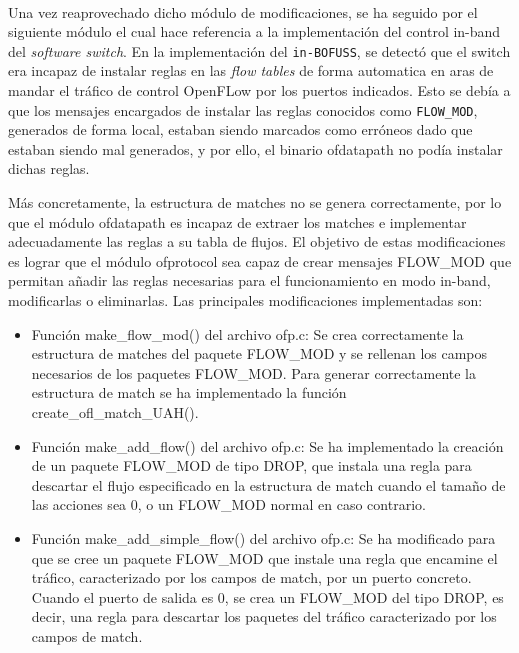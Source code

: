 \\
Una vez reaprovechado dicho módulo de modificaciones, se ha seguido por el siguiente módulo el cual hace referencia a la implementación del control in-band del \textit{software switch}. En la implementación del \texttt{in-BOFUSS}, se detectó que el switch era incapaz de instalar reglas en las \textit{flow tables} de forma automatica en aras de mandar el tráfico de control OpenFLow por los puertos indicados. Esto se debía a que los mensajes encargados de instalar las reglas conocidos como \texttt{FLOW\_MOD}, generados de forma local, estaban siendo marcados como erróneos dado que estaban siendo mal generados, y por ello, el binario ofdatapath no podía instalar dichas reglas.

Más concretamente, la estructura de matches no se genera correctamente, por lo que el módulo ofdatapath es incapaz de extraer los matches e implementar adecuadamente las reglas a su tabla de flujos. El objetivo de estas modificaciones es lograr que el módulo ofprotocol sea capaz de crear mensajes FLOW\_MOD que permitan añadir las reglas necesarias para el funcionamiento en modo in-band, modificarlas o eliminarlas. Las principales modificaciones implementadas son:

\begin{itemize}
    \item Función make\_flow\_mod() del archivo ofp.c: Se crea correctamente la estructura de matches del paquete FLOW\_MOD y se rellenan los campos necesarios de los paquetes FLOW\_MOD. Para generar correctamente la estructura de match se ha implementado la función create\_ofl\_match\_UAH().

    \item Función make\_add\_flow() del archivo ofp.c: Se ha implementado la creación de un paquete FLOW\_MOD de tipo DROP, que instala una regla para descartar el flujo especificado en la estructura de match cuando el tamaño de las acciones sea 0, o un FLOW\_MOD normal en caso contrario.

    \item Función make\_add\_simple\_flow() del archivo ofp.c: Se ha modificado para que se cree un paquete FLOW\_MOD que instale una regla que encamine el tráfico, caracterizado por los campos de match, por un puerto concreto. Cuando el puerto de salida es 0, se crea un FLOW\_MOD del tipo DROP, es decir, una regla para descartar los paquetes del tráfico caracterizado por los campos de match.
\end{itemize}


